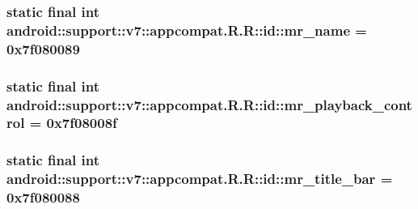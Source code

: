 \hypertarget{classandroid_1_1support_1_1v7_1_1appcompat_1_1_r_1_1id_371eda18fc01fdf52d5523c81dca8874}{
\subsubsection[{mr\_\-name}]{\setlength{\rightskip}{0pt plus 5cm}static final int android::support::v7::appcompat.R.R::id::mr\_\-name = 0x7f080089}}
\label{classandroid_1_1support_1_1v7_1_1appcompat_1_1_r_1_1id_371eda18fc01fdf52d5523c81dca8874}


\hypertarget{classandroid_1_1support_1_1v7_1_1appcompat_1_1_r_1_1id_8a8ca6ad0ba8c754ac54023fe6d7e196}{
\subsubsection[{mr\_\-playback\_\-control}]{\setlength{\rightskip}{0pt plus 5cm}static final int android::support::v7::appcompat.R.R::id::mr\_\-playback\_\-control = 0x7f08008f}}
\label{classandroid_1_1support_1_1v7_1_1appcompat_1_1_r_1_1id_8a8ca6ad0ba8c754ac54023fe6d7e196}


\hypertarget{classandroid_1_1support_1_1v7_1_1appcompat_1_1_r_1_1id_28b5bf1940896227e8dcfaec6afed83b}{
\subsubsection[{mr\_\-title\_\-bar}]{\setlength{\rightskip}{0pt plus 5cm}static final int android::support::v7::appcompat.R.R::id::mr\_\-title\_\-bar = 0x7f080088}}
\label{classandroid_1_1support_1_1v7_1_1appcompat_1_1_r_1_1id_28b5bf1940896227e8dcfaec6afed83b}


